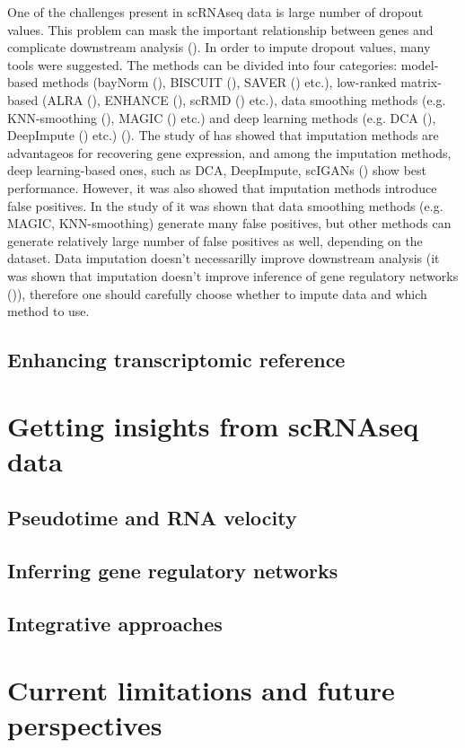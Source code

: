 One of the challenges present in scRNAseq data is large number of dropout values.
This problem can mask the important relationship between genes and complicate downstream analysis (\cite{Wang2022}).
In order to impute dropout values, many tools were suggested.
The methods can be divided into four categories:
model-based methods (bayNorm (\cite{Tang2019}), BISCUIT (\cite{Azizi2017}), SAVER (\cite{Huang2018}) etc.),
low-ranked matrix-based (ALRA (\cite{Linderman2022}), ENHANCE (\cite{Wagner2019}), scRMD (\cite{Chen2020}) etc.),
data smoothing methods (e.g. KNN-smoothing (\cite{Wagner2017}), MAGIC (\cite{Dijk2018}) etc.) and
deep learning methods (e.g. DCA (\cite{Eraslan2019}), DeepImpute (\cite{Arisdakessian2019}) etc.) (\cite{Wang2022}).
The study of \textcite{Dai2022} has showed that imputation methods are advantageos for recovering gene expression,
and among the imputation methods, deep learning-based ones,
such as DCA, DeepImpute, scIGANs (\cite{Xu2020}) show best performance.
However, it was also showed that imputation methods introduce false positives.
In the study of \textcite{Andrews2019} it was shown that data smoothing methods (e.g. MAGIC, KNN-smoothing)
generate many false positives, but other methods can generate relatively large number of false positives as well,
depending on the dataset.
Data imputation doesn't necessarilly improve downstream analysis
(it was shown that imputation doesn't improve inference of gene regulatory networks (\cite{McCalla2023})),
therefore one should carefully choose whether to impute data and which method to use.

\subsection{Enhancing transcriptomic reference}

\section{Getting insights from scRNAseq data}

\subsection{Pseudotime and RNA velocity}

\subsection{Inferring gene regulatory networks}

\subsection{Integrative approaches}

\section{Current limitations and future perspectives}

